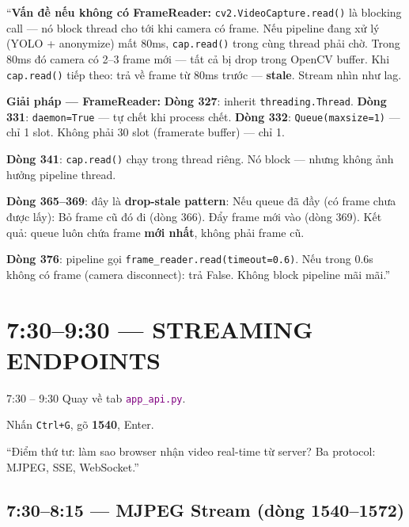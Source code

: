\documentclass[12pt, a4paper]{article}
\newcommand{\fpath}[1]{\texttt{\textcolor{purple}{#1}}}
\begin{document}
\begin{say}
``\textbf{Vấn đề nếu không có FrameReader:}
\texttt{cv2.VideoCapture.read()} là blocking call --- nó block thread cho tới khi camera có frame.
Nếu pipeline đang xử lý (YOLO + anonymize) mất 80ms,
\texttt{cap.read()} trong cùng thread phải chờ.
Trong 80ms đó camera có 2--3 frame mới --- tất cả bị drop trong OpenCV buffer.
Khi \texttt{cap.read()} tiếp theo: trả về frame từ 80ms trước --- \textbf{stale}.
Stream nhìn như lag.

\textbf{Giải pháp --- FrameReader:}
\textbf{Dòng 327}: inherit \texttt{threading.Thread}.
\textbf{Dòng 331}: \texttt{daemon=True} --- tự chết khi process chết.
\textbf{Dòng 332}: \texttt{Queue(maxsize=1)} --- chỉ 1 slot.
Không phải 30 slot (framerate buffer) --- chỉ 1.

\textbf{Dòng 341}: \texttt{cap.read()} chạy trong thread riêng.
Nó block --- nhưng không ảnh hưởng pipeline thread.

\textbf{Dòng 365--369}: đây là \textbf{drop-stale pattern}:
Nếu queue đã đầy (có frame chưa được lấy):
Bỏ frame cũ đó đi (dòng 366).
Đẩy frame mới vào (dòng 369).
Kết quả: queue luôn chứa frame \textbf{mới nhất}, không phải frame cũ.

\textbf{Dòng 376}: pipeline gọi \texttt{frame\_reader.read(timeout=0.6)}.
Nếu trong 0.6s không có frame (camera disconnect): trả False.
Không block pipeline mãi mãi.''
\end{say}

\section{7:30--9:30 --- STREAMING ENDPOINTS}

\begin{timing}{7:30 -- 9:30}
Quay về tab \fpath{app\_api.py}.
\end{timing}

\begin{doact}
Nhấn \texttt{Ctrl+G}, gõ \textbf{1540}, Enter.
\end{doact}

\begin{say}
``Điểm thứ tư: làm sao browser nhận video real-time từ server?
Ba protocol: MJPEG, SSE, WebSocket.''
\end{say}

\subsection{7:30--8:15 --- MJPEG Stream (dòng 1540--1572)}
\end{document}
